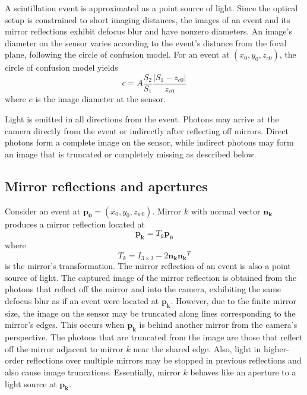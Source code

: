 A scintillation event is approximated as a point source of light.
Since the optical setup is constrained to short imaging distances, 
the images of an event and its mirror reflections exhibit defocus blur and 
have nonzero diameters.
An image's diameter on the sensor varies according to the event's distance from 
the focal plane, following the circle of confusion model.
For an event at $(x_0,y_0,z_{c0})$, 
the circle of confusion model yields
\begin{equation} \label{eqn:circ_of_conf}
c=A\frac{S_2}{S_1}\frac{|S_1-z_{c0}|}{z_{c0}}
\end{equation}
where $c$ is the image diameter at the sensor.

Light is emitted in all directions from the event.
Photons may arrive at the camera directly from the event or indirectly after 
reflecting off mirrors.
Direct photons form a complete image on the sensor, while indirect photons may 
form an image that is truncated or completely missing as described below.


\subsection{Mirror reflections and apertures}

Consider an event at $\bm{p_0}=(x_0,y_0,z_{w0})$.
Mirror $k$ with normal vector $\bm{n_k}$ produces a mirror reflection located at 
\begin{equation}
\bm{p_k}=T_k\bm{p_0}
\end{equation}
where
\begin{equation} \label{eqn:ref_trans}
T_k=I_{3\times3} - 2\bm{n_k}\bm{n_k}^T
\end{equation}
is the mirror's transformation.
The mirror reflection of an event is also a point source of light.
The captured image of the mirror reflection is obtained from the photons that 
reflect off the mirror and into the camera, exhibiting the same defocus blur as if 
an event were located at $\bm{p_k}$.
However, due to the finite mirror size, the image on the sensor may be truncated 
along lines corresponding to the mirror's edges.
This occurs when $\bm{p_k}$ is behind another mirror from the camera's perspective.
The photons that are truncated from the image are those that reflect off the 
mirror adjacent to mirror $k$ near the shared edge.
Also, light in higher-order reflections over multiple mirrors may be stopped 
in previous reflections and also cause image truncations.
Essentially, mirror $k$ behaves like an aperture to a light source at $\bm{p_k}$. 

